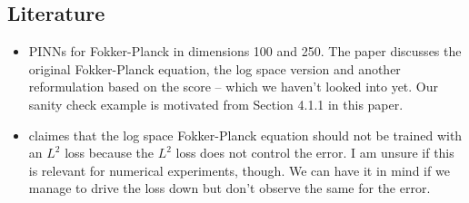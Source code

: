 \subsection{Literature}
\begin{itemize}
    \item \cite{hu2024score} PINNs for Fokker-Planck in dimensions 100 and 250. The paper discusses the original Fokker-Planck equation, the log space version and another reformulation based on the score -- which we haven't looked into yet. Our sanity check example is motivated from Section 4.1.1 in this paper. 
    \item \cite{wang20222} claimes that the log space Fokker-Planck equation should not be trained with an $L^2$ loss because the $L^2$ loss does not control the error. I am unsure if this is relevant for numerical experiments, though. We can have it in mind if we manage to drive the loss down but don't observe the same for the error. 
\end{itemize}